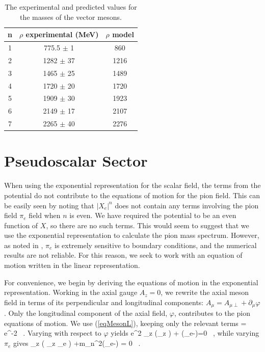 \begin{table}[htb]
\center
\begin{tabular}{| c || c | c  |}
\hline
n & $\rho$ experimental (MeV) & $\rho$ model \\
\hline
1 & 775.5 $\pm$  1 & 860	\\
2 & 1282 $\pm$ 37 & 1216 \\
3 & 1465 $\pm$ 25 & 1489 \\
4 &  1720 $\pm$ 20 & 1720 \\ 
5 &  1909 $\pm$ 30 & 1923 \\
6 &  2149 $\pm$  17& 2107 \\
7 &  2265 $\pm$  40& 2276 \\ 
\hline
\end{tabular}
\caption{The experimental \cite{PDG} and predicted values for the masses of the vector mesons.}
\label{tabRho}
\end{table}

\section{Pseudoscalar Sector}

When using the exponential representation for the scalar field, the terms from the potential do not contribute to the equations of motion for the pion field.
This can be easily seen by noting that $|X_e|^n$ does not contain any terms involving the pion field $\pi_e$ field when $n$ is even. 
We have required the potential to be an even function of $X$, so there are no such terms.
This would seem to suggest that we use the exponential representation to calculate the pion mass spectrum.
However, as noted in \cite{bartz-pions}, $\pi_e$ is extremely sensitive to boundary conditions, and the numerical results are not reliable.
For this reason, we seek to work with an equation of motion written in the linear representation.

For convenience, we begin by deriving the equations of motion in the exponential representation.
Working in the axial gauge $A_z = 0$, we rewrite the axial meson field in terms of its perpendicular and longitudinal components: $A_\mu = A_{\mu\perp} +\partial_\mu \varphi$.
Only the longitudinal component of the axial field, $\varphi$, contributes to the pion equations of motion.
We use (\ref{eqMesonL}), keeping only the relevant terms
\be
\cL = e^{-2\Phi}   \, .
\ee
Varying with respect to $\varphi$ yields
\be
e^{2\Phi} \partial_z \left(\partial_z \varphi \right) + (\pi_e-\varphi)=0 \, ,
\ee
while varying $\pi_e$ gives
\be
{}\partial_z \left( \partial_z \pi_e \right) +m_n^2(\pi_e-\varphi) = 0 \, .
\ee


